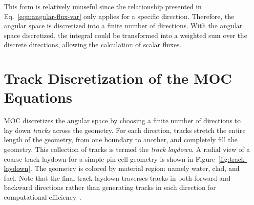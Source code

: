 This form is relatively unuseful since the relationship presented in Eq.~\ref{eqn:angular-flux-var} only applies for a specific direction. Therefore, the angular space is discretized into a finite number of directions. With the angular space discretized, the integral could be transformed into a weighted sum over the discrete directions, allowing the calculation of scalar fluxes.

\section{Track Discretization of the MOC Equations}

MOC discretizes the angular space by choosing a finite number of directions to lay down \textit{tracks} across the geometry. For each direction, tracks stretch the entire length of the geometry, from one boundary to another, and completely fill the geometry. This collection of tracks is termed the \textit{track laydown}. A radial view of a coarse track laydown for a simple pin-cell geometry is shown in Figure~\ref{fig:track-laydown}. The geometry is colored by material region; namely water, clad, and fuel. Note that the final track laydown traverses tracks in both forward and backward directions rather than generating tracks in each direction for computational efficiency~\cite{kochunas2007twoway}.


